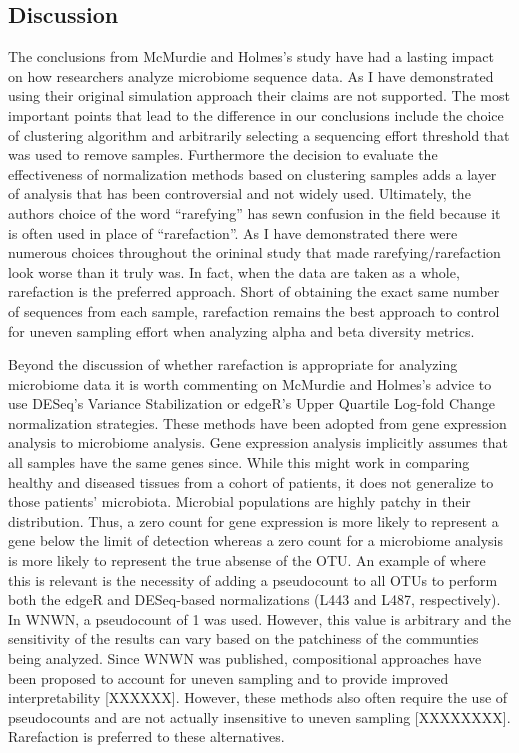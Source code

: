 \documentclass[
]{article}
\begin{document}
\hypertarget{discussion}{%
\subsection{Discussion}\label{discussion}}

The conclusions from McMurdie and Holmes's study have had a lasting
impact on how researchers analyze microbiome sequence data. As I have
demonstrated using their original simulation approach their claims are
not supported. The most important points that lead to the difference in
our conclusions include the choice of clustering algorithm and
arbitrarily selecting a sequencing effort threshold that was used to
remove samples. Furthermore the decision to evaluate the effectiveness
of normalization methods based on clustering samples adds a layer of
analysis that has been controversial and not widely used. Ultimately,
the authors choice of the word ``rarefying'' has sewn confusion in the
field because it is often used in place of ``rarefaction''. As I have
demonstrated there were numerous choices throughout the orininal study
that made rarefying/rarefaction look worse than it truly was. In fact,
when the data are taken as a whole, rarefaction is the preferred
approach. Short of obtaining the exact same number of sequences from
each sample, rarefaction remains the best approach to control for uneven
sampling effort when analyzing alpha and beta diversity metrics.

Beyond the discussion of whether rarefaction is appropriate for
analyzing microbiome data it is worth commenting on McMurdie and
Holmes's advice to use DESeq's Variance Stabilization or edgeR's Upper
Quartile Log-fold Change normalization strategies. These methods have
been adopted from gene expression analysis to microbiome analysis. Gene
expression analysis implicitly assumes that all samples have the same
genes since. While this might work in comparing healthy and diseased
tissues from a cohort of patients, it does not generalize to those
patients' microbiota. Microbial populations are highly patchy in their
distribution. Thus, a zero count for gene expression is more likely to
represent a gene below the limit of detection whereas a zero count for a
microbiome analysis is more likely to represent the true absense of the
OTU. An example of where this is relevant is the necessity of adding a
pseudocount to all OTUs to perform both the edgeR and DESeq-based
normalizations (L443 and L487, respectively). In WNWN, a pseudocount of
1 was used. However, this value is arbitrary and the sensitivity of the
results can vary based on the patchiness of the communties being
analyzed. Since WNWN was published, compositional approaches have been
proposed to account for uneven sampling and to provide improved
interpretability {[}XXXXXX{]}. However, these methods also often require
the use of pseudocounts and are not actually insensitive to uneven
sampling {[}XXXXXXXX{]}. Rarefaction is preferred to these alternatives.
\end{document}
